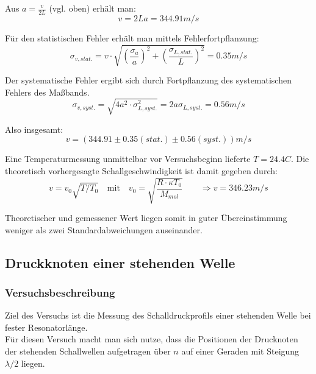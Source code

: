 \documentclass[12pt,a4paper]{article}
\begin{document}
Aus $a=\frac{v}{2L}$ (vgl. oben) erhält man:
\begin{equation}
	v=2La=344.91 m/s
\end{equation}

Für den statistischen Fehler erhält man mittels Fehlerfortpflanzung:
\begin{equation}
	\sigma_{v,stat.}=v \cdot \sqrt{(\frac{\sigma_a}{a})^2+		(\frac{\sigma_{L,stat.}}{L})^2}=0.35 m/s
\end{equation}

Der systematische Fehler ergibt sich durch Fortpflanzung des systematischen Fehlers des Maßbands.
\begin{equation}
	\sigma_{v,syst.}=\sqrt{4a^2 \cdot \sigma_{L,syst.}^2}		=2a \sigma_{L,syst.}=0.56 m/s
\end{equation}

Also insgesamt:
\begin{equation}
v=(344.91 \pm 0.35(stat.) \pm 0.56(syst.))m/s
\end{equation}

Eine Temperaturmessung unmittelbar vor Versuchsbeginn lieferte $T=24.4 C$. Die theoretisch vorhergesagte Schallgeschwindigkeit ist damit gegeben durch:
\begin{equation}
v=v_0 \sqrt{T/T_0} \quad \text{mit} \quad v_0=\sqrt{\frac{R \cdot \kappa T_0}			{M_{mol}}}
\qquad
\Rightarrow v=346.23 m/s
\end{equation}

Theoretischer und gemessener Wert liegen somit in guter Übereinstimmung weniger als zwei Standardabweichungen auseinander.




\subsection{Druckknoten einer stehenden Welle}

\subsubsection{Versuchsbeschreibung}
Ziel des Versuchs ist die Messung des Schalldruckprofils einer stehenden Welle bei fester Resonatorlänge.\\
Für diesen Versuch macht man sich nutze, dass die Positionen der Drucknoten der stehenden Schallwellen aufgetragen über $n$ auf einer Geraden mit Steigung  $\lambda/2$ liegen.
\end{document}
